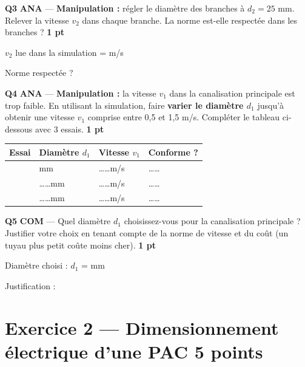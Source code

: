\documentclass[a4paper,11pt]{article}
\newcommand{\pts}[1]{\hfill\textcolor{gris}{\small\textbf{#1}}}
\newcommand{\comp}[1]{\colorbox{blue!10}{\scriptsize\textbf{#1}}}
\begin{document}
\textbf{Q3} \comp{ANA} — \textbf{Manipulation :} régler le diamètre des branches à $d_2 = 25$ mm. Relever la vitesse $v_2$ dans chaque branche. La norme est-elle respectée dans les branches ? \pts{1 pt}

\begin{reponsebox}[2.5cm]
$v_2$ lue dans la simulation = \dotfill m/s

Norme respectée ? \dotfill
\end{reponsebox}

\textbf{Q4} \comp{ANA} — \textbf{Manipulation :} la vitesse $v_1$ dans la canalisation principale est trop faible. En utilisant la simulation, faire \textbf{varier le diamètre $d_1$} jusqu'à obtenir une vitesse $v_1$ comprise entre 0,5 et 1,5 m/s. Compléter le tableau ci-dessous avec 3 essais. \pts{1 pt}

\begin{center}
\renewcommand{\arraystretch}{1.8}
\begin{tabular}{|>{\centering\arraybackslash}m{2.5cm}|>{\centering\arraybackslash}m{2.5cm}|>{\centering\arraybackslash}m{2.5cm}|>{\centering\arraybackslash}m{2.5cm}|}
\hline
\textbf{Essai} & \textbf{Diamètre $d_1$} & \textbf{Vitesse $v_1$} & \textbf{Conforme ?} \\
\hline
1 & 40 mm & \ldots\ldots m/s & \ldots\ldots \\
\hline
2 & \ldots\ldots mm & \ldots\ldots m/s & \ldots\ldots \\
\hline
3 & \ldots\ldots mm & \ldots\ldots m/s & \ldots\ldots \\
\hline
\end{tabular}
\renewcommand{\arraystretch}{1}
\end{center}

\textbf{Q5} \comp{COM} — Quel diamètre $d_1$ choisissez-vous pour la canalisation principale ? Justifier votre choix en tenant compte de la norme de vitesse et du coût (un tuyau plus petit coûte moins cher). \pts{1 pt}

\begin{reponsebox}[3.5cm]
Diamètre choisi : $d_1$ = \dotfill mm

Justification : \dotfill

\dotfill

\dotfill
\end{reponsebox}

\newpage

\section*{Exercice 2 — Dimensionnement électrique d'une PAC \pts{5 points}}
\end{document}

